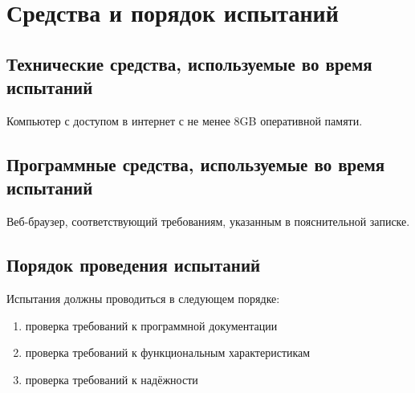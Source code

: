 \section{Средства и порядок испытаний}

\subsection{Технические средства, используемые во время испытаний}

Компьютер с доступом в интернет с не менее 8GB оперативной памяти.

\subsection{Программные средства, используемые во время испытаний}

Веб-браузер, соответствующий требованиям, указанным в пояснительной записке.

\subsection{Порядок проведения испытаний}

Испытания должны проводиться в следующем порядке:
\begin{enumerate}
    \item проверка требований к программной документации
    \item проверка требований к функциональным характеристикам
    \item проверка требований к надёжности
\end{enumerate}